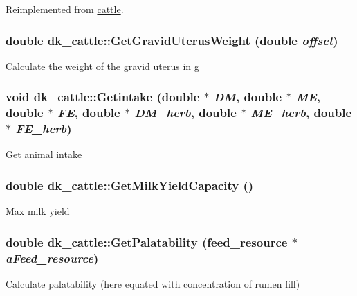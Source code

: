 Reimplemented from \hyperlink{classcattle_a46b5f1e591b420acb2e2ce0e69aef5fe}{cattle}.\hypertarget{classdk__cattle_a1df5fbfbccd961fab8ec58af68acec61}{
\subsubsection[{GetGravidUterusWeight}]{\setlength{\rightskip}{0pt plus 5cm}double dk\_\-cattle::GetGravidUterusWeight (double {\em offset})}}
\label{classdk__cattle_a1df5fbfbccd961fab8ec58af68acec61}
Calculate the weight of the gravid uterus in g \hypertarget{classdk__cattle_a5a2d0118d148a07540eea1dc1beded3f}{
\subsubsection[{Getintake}]{\setlength{\rightskip}{0pt plus 5cm}void dk\_\-cattle::Getintake (double $\ast$ {\em DM}, \/  double $\ast$ {\em ME}, \/  double $\ast$ {\em FE}, \/  double $\ast$ {\em DM\_\-herb}, \/  double $\ast$ {\em ME\_\-herb}, \/  double $\ast$ {\em FE\_\-herb})}}
\label{classdk__cattle_a5a2d0118d148a07540eea1dc1beded3f}
Get \hyperlink{classanimal}{animal} intake \hypertarget{classdk__cattle_a86a98757dfb0ead62dc410651c5ed426}{
\subsubsection[{GetMilkYieldCapacity}]{\setlength{\rightskip}{0pt plus 5cm}double dk\_\-cattle::GetMilkYieldCapacity ()}}
\label{classdk__cattle_a86a98757dfb0ead62dc410651c5ed426}
Max \hyperlink{classmilk}{milk} yield \hypertarget{classdk__cattle_a7ab0e6b1bce961a575452a47d6ac5650}{
\subsubsection[{GetPalatability}]{\setlength{\rightskip}{0pt plus 5cm}double dk\_\-cattle::GetPalatability ({\bf feed\_\-resource} $\ast$ {\em aFeed\_\-resource})}}
\label{classdk__cattle_a7ab0e6b1bce961a575452a47d6ac5650}
Calculate palatability (here equated with concentration of rumen fill) 

